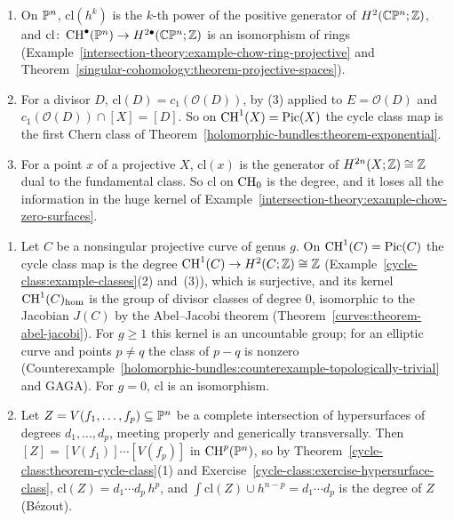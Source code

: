 \begin{example}\label{cycle-class:example-classes}
\begin{enumerate}
\item On $\mathbb{P}^n$, $\mathrm{cl}(h^k)$ is the $k$-th power of the positive generator of $H^2(\mathbb{C}\mathbb{P}^n; \mathbb{Z})$, and $\mathrm{cl} \colon \operatorname{CH}^\bullet(\mathbb{P}^n) \to H^{2\bullet}(\mathbb{C}\mathbb{P}^n; \mathbb{Z})$ is an isomorphism of
rings (Example~\ref{intersection-theory:example-chow-ring-projective} and Theorem~\ref{singular-cohomology:theorem-projective-spaces}).
\item For a divisor $D$, $\mathrm{cl}(D) = c_1(\mathcal{O}(D))$, by (3) applied to $E = \mathcal{O}(D)$ and $c_1(\mathcal{O}(D)) \cap [X] = [D]$. So on $\operatorname{CH}^1(X) = \operatorname{Pic}(X)$ the cycle class map is the first
Chern class of Theorem~\ref{holomorphic-bundles:theorem-exponential}.
\item For a point $x$ of a projective $X$, $\mathrm{cl}(x)$ is the generator of $H^{2n}(X; \mathbb{Z}) \cong \mathbb{Z}$ dual to the fundamental class. So $\mathrm{cl}$ on $\operatorname{CH}_0$ is the degree, and it loses all the
information in the huge kernel of Example~\ref{intersection-theory:example-chow-zero-surfaces}.
\end{enumerate}
\end{example}

\begin{example}\label{cycle-class:example-kernel-curves}
\begin{enumerate}
\item Let $C$ be a nonsingular projective curve of genus $g$. On $\operatorname{CH}^1(C) = \operatorname{Pic}(C)$ the cycle class map is the degree $\operatorname{CH}^1(C) \to H^2(C; \mathbb{Z}) \cong \mathbb{Z}$ (Example~\ref{cycle-class:example-classes}(2) and~(3)),
which is surjective, and its kernel $\operatorname{CH}^1(C)_{\mathrm{hom}}$ is the group of divisor classes of degree $0$, isomorphic to the Jacobian $J(C)$ by the Abel--Jacobi theorem
(Theorem~\ref{curves:theorem-abel-jacobi}). For $g \geq 1$ this kernel is an uncountable group; for an elliptic curve and points $p \neq q$ the class of $p - q$ is nonzero
(Counterexample~\ref{holomorphic-bundles:counterexample-topologically-trivial} and GAGA). For $g = 0$, $\mathrm{cl}$ is an isomorphism.
\item Let $Z = V(f_1, \ldots, f_p) \subseteq \mathbb{P}^n$ be a complete intersection of hypersurfaces of degrees $d_1, \ldots, d_p$, meeting properly and generically transversally. Then
$[Z] = [V(f_1)] \cdots [V(f_p)]$ in $\operatorname{CH}^p(\mathbb{P}^n)$, so by Theorem~\ref{cycle-class:theorem-cycle-class}(1) and Exercise~\ref{cycle-class:exercise-hypersurface-class},
$\mathrm{cl}(Z) = d_1 \cdots d_p\,h^p$, and $\int\mathrm{cl}(Z) \cup h^{n-p} = d_1 \cdots d_p$ is the degree of $Z$ (B\'ezout).
\end{enumerate}
\end{example}

